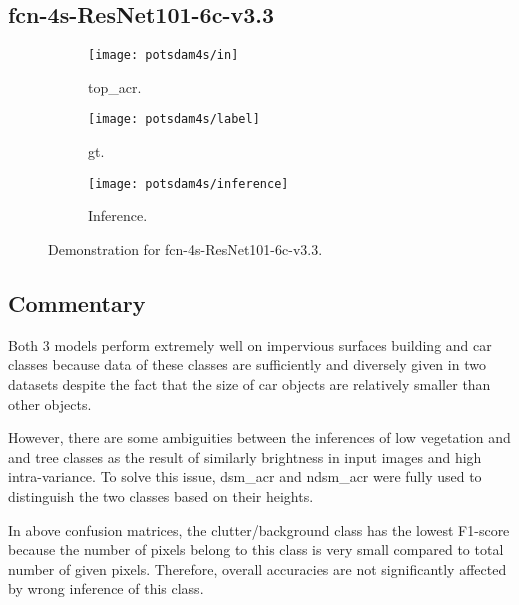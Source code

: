 \subsection{\acrshort{fcn}-4s-ResNet101-6c-v3.3}
\begin{figure}[h!]
    \centering
    \begin{subfigure}[b]{0.5\linewidth}
        \texttt{[image: potsdam4s/in]}
        \caption{\acrshort{top_acr}.}
    \end{subfigure}
    \begin{subfigure}[b]{0.5\linewidth}
        \texttt{[image: potsdam4s/label]}
        \caption{\Gls{gt}.}
    \end{subfigure}
    \begin{subfigure}[b]{0.5\linewidth}
        \texttt{[image: potsdam4s/inference]}
        \caption{Inference.}
    \end{subfigure}
    \caption{Demonstration for \acrshort{fcn}-4s-ResNet101-6c-v3.3.}
    \label{fig:4s_potsdam_demo}
\end{figure}

\clearpage
\subsection{Commentary}
Both 3 models perform extremely well on impervious surfaces building and car
classes because data of these classes are sufficiently and diversely given in
two datasets despite the fact that the size of car objects are relatively
smaller than other objects.

However, there are some ambiguities between the inferences of low vegetation
and and tree classes as the result of similarly brightness in input images and
high intra-variance. To solve this issue, \acrshort{dsm_acr} and
n\acrshort{dsm_acr} were fully used to distinguish the two classes based on
their heights.

In above confusion matrices, the clutter/background class has the lowest
F1-score because the number of pixels belong to this class is very small
compared to total number of given pixels. Therefore, overall accuracies are not
significantly affected by wrong inference of this class.

